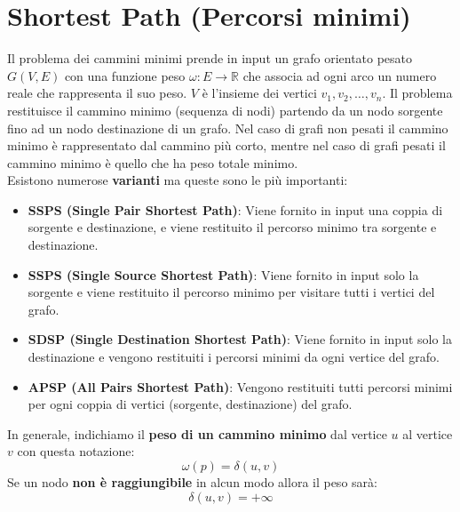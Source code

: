 \section{Shortest Path (Percorsi minimi)}
Il problema dei cammini minimi prende in input un grafo orientato pesato 
$G(V,E)$ con una funzione peso $\omega:E \to \mathbb{R}$ che associa ad ogni arco un numero reale 
che rappresenta il suo peso. $V$ è l'insieme dei vertici $v_1,v_2,\dots, v_n$. Il problema 
restituisce il cammino minimo (sequenza di nodi) partendo da un nodo sorgente fino ad un nodo destinazione di un grafo. Nel caso di 
grafi non pesati il cammino minimo è rappresentato dal cammino più corto, mentre nel caso di grafi pesati il cammino minimo è quello che ha peso totale minimo.\smallskip\\
Esistono numerose \textbf{varianti} ma queste sono le più importanti:
\begin{itemize}
    \item \textbf{SSPS (Single Pair Shortest Path)}: Viene fornito in input una coppia di sorgente e destinazione, e viene restituito
    il percorso minimo tra sorgente e destinazione.
    \item \textbf{SSPS (Single Source Shortest Path)}: Viene fornito in input solo la sorgente e viene restituito il percorso minimo per visitare tutti i vertici del grafo.
    \item \textbf{SDSP (Single Destination Shortest Path)}: Viene fornito in input solo la destinazione e vengono restituiti i percorsi minimi da ogni vertice del grafo.
    \item \textbf{APSP (All Pairs Shortest Path)}: Vengono restituiti tutti percorsi minimi per ogni coppia di vertici (sorgente, destinazione) del grafo. 
\end{itemize}
In generale, indichiamo il \textbf{peso di un cammino minimo} dal vertice $u$ al vertice $v$ 
con questa notazione:
\[ \omega (p) = \delta (u,v)    \]
Se un nodo \textbf{non è raggiungibile} in alcun modo allora il peso sarà:
\[  \delta (u,v) = +\infty    \]



